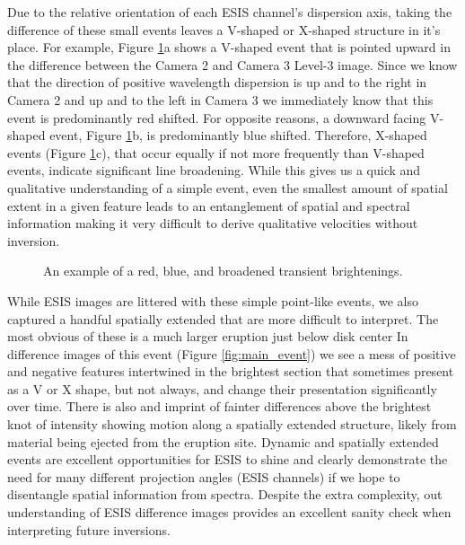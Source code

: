     	Due to the relative orientation of each ESIS channel's dispersion axis, taking the difference of these small events leaves a V-shaped or X-shaped structure in it's place.
    	For example, Figure \ref{fig:dif_events}a shows a V-shaped event that is pointed upward in the difference between the Camera 2 and Camera 3 Level-3 image.
    	Since we know that the direction of positive wavelength dispersion is up and to the right in Camera 2 and up and to the left in Camera 3 we immediately know that this event is predominantly red shifted.
    	For opposite reasons, a downward facing V-shaped event, Figure \ref{fig:dif_events}b, is predominantly blue shifted.
    	Therefore, X-shaped events (Figure \ref{fig:dif_events}c), that occur equally if not more frequently than V-shaped events, indicate significant line broadening.
    	While this gives us a quick and qualitative understanding of a simple event, even the smallest amount of spatial extent in a given feature leads to an entanglement of spatial and spectral information making it very difficult to derive qualitative velocities without inversion. 
    	
    	\begin{figure}[htb!]
    		\centering
    		\caption{An example of a red, blue, and broadened transient brightenings.}
    		\label{fig:dif_events}
    	\end{figure}
    	
    	While ESIS images are littered with these simple point-like events, we also captured a handful spatially extended that are more difficult to interpret.
    	The most obvious of these is a much larger eruption just below disk center 
    	In difference images of this event (Figure \ref{fig:main_event}) we see a mess of positive and negative features intertwined in the brightest section that sometimes present as a V or X shape, but not always, and change their presentation significantly over time.
    	There is also and imprint of fainter differences above the brightest knot of intensity showing motion along a spatially extended structure, likely from material being ejected from the eruption site.
    	Dynamic and spatially extended events are excellent opportunities for ESIS to shine and clearly demonstrate the need for many different projection angles (ESIS channels) if we hope to disentangle spatial information from spectra.
    	Despite the extra complexity, out understanding of ESIS difference images provides an excellent sanity check when interpreting future inversions.
    	
